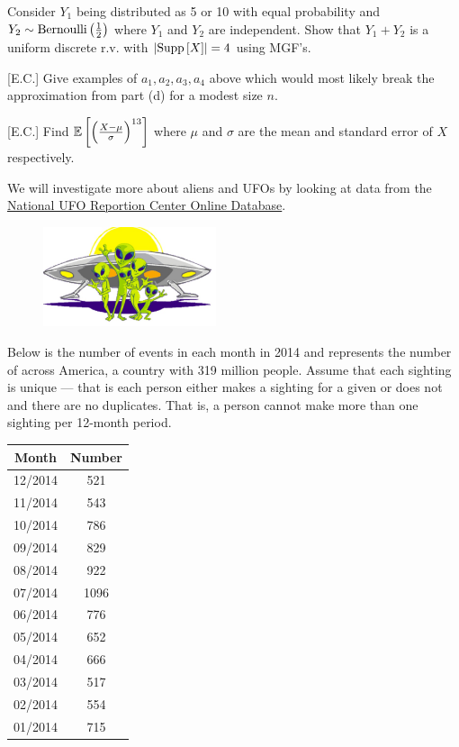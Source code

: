 \documentclass[12pt]{article}
\begin{document}
 Consider $Y_1$ being distributed as 5 or 10 with equal probability and $Y_2 \sim \mathrm{Bernoulli}\left(\frac{1}{2}\right)$ where $Y_1$ and $Y_2$ are independent. Show that $Y_1 + Y_2$ is a uniform discrete r.v. with $\left|\text{Supp}\left[X\right]\right| = 4$ using MGF's. 



 [E.C.] Give examples of $a_1, a_2, a_3, a_4$ above which would most likely break the approximation from part (d) for a modest size $n$. 

 [E.C.] Find $\mathbb{E}\left[\left(\frac{X-\mu}{\sigma}\right)^{13}\right]$ where $\mu$ and $\sigma$ are the mean and standard error of $X$ respectively. 

\eenum




\problem We will investigate more about aliens and UFOs by looking at data from the \href{http://www.nuforc.org/webreports/ndxevent.html}{National UFO Reportion Center Online Database}.

\begin{figure}[htp]
\centering
\includegraphics[width=2in]{ufo.jpg}
\end{figure}

Below is the number of events in each month in 2014 and represents the number of  across America, a country with 319 million people. Assume that each sighting is unique --- that is each person either makes a sighting for a given or does not and there are no duplicates. That is, a person cannot make more than one sighting per 12-month period.

\begin{table}[htp]
\small
\centering
\begin{tabular}{c|c}
Month & Number \\ \hline
12/2014 &	521 \\
11/2014	&543 \\
10/2014	&786 \\
09/2014	&829 \\
08/2014	&922 \\
07/2014	&1096 \\
06/2014	&776 \\
05/2014	&652 \\
04/2014	&666 \\
03/2014	&517 \\
02/2014	&554 \\
01/2014	&715 \\
\end{tabular}
\end{table}
\end{document}
